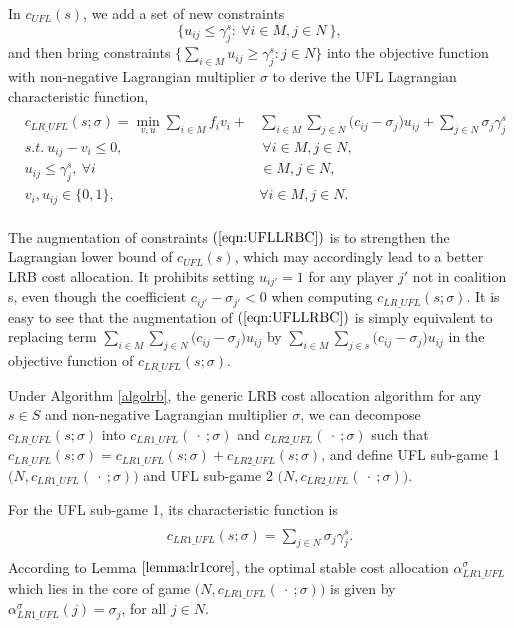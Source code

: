 In $c_{UFL}(s)$,  we add a set of new constraints
\begin{equation}\label{eqn:UFLLRBC}
\big\{ u_{ij} \leq \gamma_j^s: ~\forall i \in M, j \in N\ \big\},
\end{equation}
and then bring constraints $\{ \sum_{i \in M} u_{ij} \geq \gamma_j^s:j \in N \}$ into the objective function with non-negative Lagrangian multiplier $\sigma$ to derive the UFL Lagrangian characteristic function,
\begin{eqnarray*}\label{eqn:LRPGCF}
\begin{aligned}
\begin{split}
c_{LR\_UFL}(s;\sigma) = \min_{v,u} \sum_{i \in M} f_iv_i + &\sum_{i \in M} \sum_{j \in N} \big(c_{ij} - \sigma_{j}\big)u_{ij} + \sum_{j \in N} \sigma_j \gamma_j^s\\
s.t.~u_{ij} - v_i \leq 0,&~\forall i \in M, j \in N,\\
u_{ij} \leq \gamma_j^s,~\forall i& \in M, j \in N,\\
v_i,u_{ij} \in \{0,1\},~&\forall i \in M, j \in N.
\end{split}
\end{aligned}
\end{eqnarray*}


The augmentation of constraints $(\ref{eqn:UFLLRBC})$ is to strengthen the Lagrangian lower bound of $c_{UFL}(s)$, which may accordingly lead to a better LRB cost allocation.
It prohibits setting $u_{ij'}=1$ for any player $j'$ not in coalition s, even though the coefficient $c_{ij'}- \sigma_{j'}<0$ when computing $c_{LR\_UFL}(s;\sigma)$.
It is easy to see that the augmentation of $(\ref{eqn:UFLLRBC})$ is simply equivalent to replacing term $\sum_{i \in M} \sum_{j \in N} \big(c_{ij} - \sigma_{j}\big)u_{ij}$ by $\sum_{i \in M} \sum_{j \in s} \big(c_{ij} - \sigma_{j}\big)u_{ij}$ in the objective function of $c_{LR\_UFL}(s;\sigma)$.

Under Algorithm \ref{algolrb}, the generic LRB cost allocation algorithm for any $s \in S$ and non-negative Lagrangian multiplier $\sigma$, we can decompose $c_{LR\_UFL}(s;\sigma)$ into  $c_{LR1\_UFL}(\ \cdot \ ;\sigma)$ and $c_{LR2\_UFL}(\ \cdot \ ;\sigma)$ such that $c_{LR\_UFL}(s;\sigma) = c_{LR1\_UFL}(s;\sigma) + c_{LR2\_UFL}(s;\sigma)$, and define UFL sub-game 1 $\big(N,c_{LR1\_UFL}(\ \cdot \ ;\sigma)\big)$ and UFL sub-game 2  $\big(N,c_{LR2\_UFL}(\ \cdot \ ;\sigma)\big)$.

For the UFL sub-game 1, its characteristic function is
\begin{eqnarray}\label{eqn:UFLCFsub1}
\begin{aligned}
\begin{split}
c_{LR1\_UFL}(s;\sigma) = \sum_{j \in N} \sigma_j \gamma_j^s.
\end{split}
\end{aligned}
\end{eqnarray}
According to Lemma $\ref{lemma:lr1core}$,  the optimal stable cost allocation $\alpha_{LR1\_UFL}^{\sigma}$ which lies in the core of game $\big(N, c_{LR1\_UFL}(\ \cdot \ ;\sigma)\big)$ is given by $\alpha_{LR1\_UFL}^{\sigma}(j) = \sigma_j$, for all $j \in N$.


